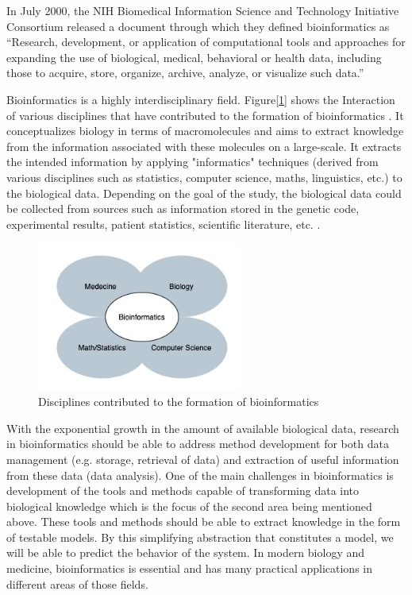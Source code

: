 In July 2000, the NIH Biomedical Information Science and Technology Initiative Consortium released a document \cite{huerta_nih_2000} 
through which they defined bioinformatics as “Research, development, or application of computational tools and approaches 
for expanding the use of biological, medical, behavioral or health data, including those to acquire, store, organize, 
archive, analyze, or visualize such data.”

Bioinformatics is a highly interdisciplinary field. Figure[\ref{fig:bioinformaticsDisciplines}] shows the Interaction 
of various disciplines that have contributed to the formation of bioinformatics \cite{bayat_science_2002}. 
It conceptualizes biology in terms of macromolecules and aims to extract knowledge from the information associated with 
these molecules on a large-scale. It extracts the intended information by applying "informatics" techniques 
(derived from various disciplines such as statistics, computer science, maths, linguistics, etc.) to the biological data. 
Depending on the goal of the study, the biological data could be collected from sources such as information stored in the 
genetic code, experimental results, patient statistics, scientific literature, etc. 
\cite{nilges_bioinformatics-definition_2011,luscombe_what_2001}.

\begin{figure}[ht]
    \centering
    \includegraphics[width=0.60\textwidth]{figures/05Bioinformatics.jpg}
    \caption{Disciplines contributed to the formation of bioinformatics \cite{bayat_science_2002}}
    \label{fig:bioinformaticsDisciplines}
\end{figure}


With the exponential growth in the amount of available biological data, research in bioinformatics should be able to 
address method development for both data management (e.g. storage, retrieval of data) and extraction of useful information 
from these data (data analysis). One of the main challenges in bioinformatics is development of the tools and methods capable 
of transforming data into biological knowledge which is the focus of the second area being mentioned above. These tools and 
methods should be able to extract knowledge in the form of testable models. By this simplifying abstraction that constitutes 
a model, we will be able to predict the behavior of the system. In modern biology and medicine, bioinformatics is essential 
and has many practical applications in different areas of those fields.

